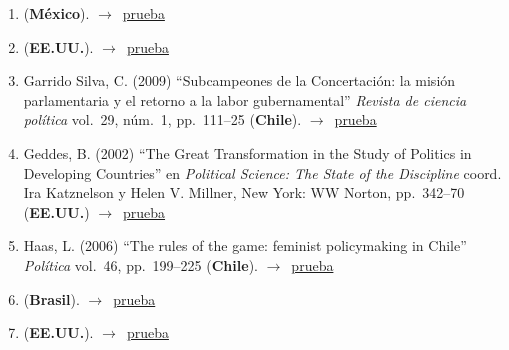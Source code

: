 \documentclass[12 pt, letter]{article}
\newenvironment{CitasMiTrabajo}{
    \begin{footnotesize}
    \begin{enumerate}[label={\footnotesize\emph{cita~\arabic*}},ref=\arabic*] %
        \setlength{\itemsep}{.1\itemsep}
        \setlength{\parskip}{.1\parskip}
    }{\end{enumerate}\end{footnotesize}}
\begin{document}
\begin{CitasMiTrabajo}
        \item {} (\textbf{M\'exico}). $\rightarrow$~\href{https://www.ssoar.info/ssoar/bitstream/handle/document/45939/ssoar-rmee-2004-4-pena-Consideraciones_para_una_reforma_electoral.pdf?sequence=1}{prueba}
        
        \item {} (\textbf{EE.UU.}). $\rightarrow$~\href{https://www.cambridge.org/core/journals/latin-american-politics-and-society/article/polarization-and-electoral-incentives-the-end-of-the-chilean-consensus-democracy-19902014/5EFB566FB13612813A1F0123E34A2DD2}{prueba}
        
        \item Garrido Silva, C. (2009)
        ``Subcampeones de la Concertaci\'on: la misi\'on parlamentaria y el retorno a la labor gubernamental''
        \emph{Revista de ciencia pol\'itica}
        vol.\ 29, n\'um.\ 1, pp.\ 111--25 (\textbf{Chile}). $\rightarrow$~\href{https://github.com/emagar/cv/blob/master/citasMiTrab/mrs/garrido2009rcp.pdf}{prueba}

        \item Geddes, B. (2002)
        ``The Great Transformation in the
        Study of Politics in Developing Countries'' en \emph{Political Science: The
        State of the Discipline} coord. Ira Katznelson y Helen V. Millner,
        New York: WW Norton, pp.\ 342--70  (\textbf{EE.UU.}) $\rightarrow$~\href{https://github.com/emagar/cv/blob/master/citasMiTrab/mrs/geddesStateOfDisc.pdf}{prueba}

        \item Haas, L. (2006)
        ``The rules of the game: feminist policymaking in Chile''
        \emph{Pol\'itica}
        vol.\ 46,
        pp.\ 199--225   (\textbf{Chile}). $\rightarrow$~\href{https://github.com/emagar/cv/blob/master/citasMiTrab/mrs/haas2006politica.pdf}{prueba}

        \item {} (\textbf{Brasil}). $\rightarrow$~\href{https://periodicos.sbu.unicamp.br/ojs/index.php/op/article/view/8653390}{prueba}
        
        \item {} (\textbf{EE.UU.}). $\rightarrow$~\href{http://202.28.199.34/multim/3125836.pdf}{prueba}
          

\end{CitasMiTrabajo}
\end{document}
